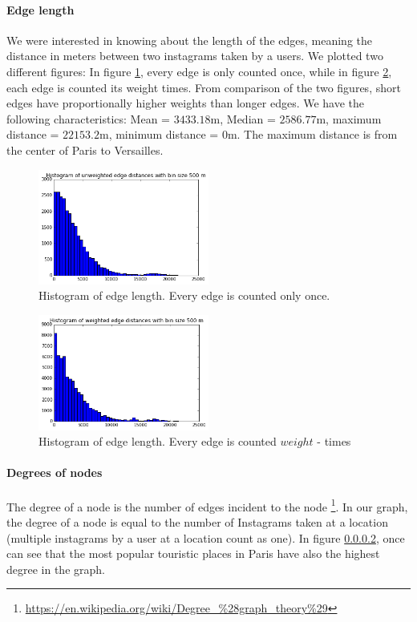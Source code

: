 \paragraph{Edge length}
We were interested in knowing about the length of the edges, meaning the distance in meters between two instagrams taken by a users. We plotted two different figures: In figure \ref{fig:unweighted_edge_distance}, every edge is only counted once, while in figure \ref{fig:weighted_edge_distance}, each edge is counted its weight times. From comparison of the two figures, short edges have proportionally higher weights than longer edges. We have the following characteristics: Mean = $3433.18$m, Median = $2586.77$m, maximum distance = $22153.2$m, minimum distance = $0$m. The maximum distance is from the center of Paris to Versailles.

\begin{figure}[h!]
  \centering
    \includegraphics[width=0.5\textwidth]{images/unweighted_edge_distance}
  \caption{Histogram of edge length. Every edge is counted only once.}
  \label{fig:unweighted_edge_distance}
\end{figure}

\begin{figure}[h!]
  \centering
    \includegraphics[width=0.5\textwidth]{images/weighted_edge_distance}
  \caption{Histogram of edge length. Every edge is counted $weight$ - times}
  \label{fig:weighted_edge_distance}
\end{figure}

\paragraph{Degrees of nodes}
The degree of a node is the number of edges incident to the node \footnote{\url{https://en.wikipedia.org/wiki/Degree_\%28graph_theory\%29}}. In our graph, the degree of a node is equal to the number of Instagrams taken at a location (multiple instagrams by a user at a location count as one). In figure \ref{}, once can see that the most popular touristic places in Paris have also the highest degree in the graph.

